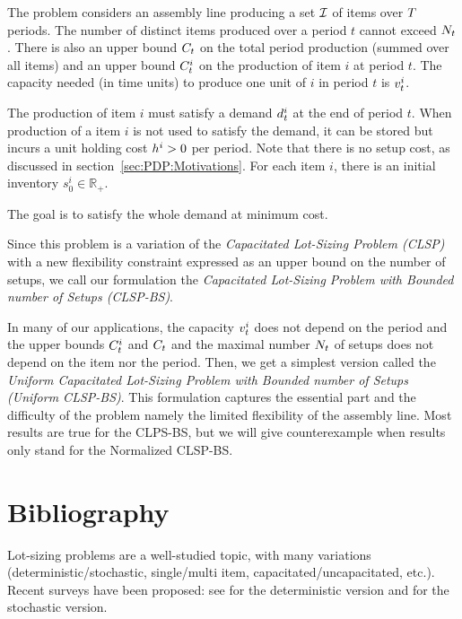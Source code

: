 The problem considers an assembly line producing a set $\mathcal{I}$ of items over $T$ periods. The number of distinct items produced over a period $t$ cannot exceed $N_t$. There is also an upper bound $C_t$ on the total period production (summed over all items) and an upper bound $C_t^i$ on the production of item $i$ at period $t$. The capacity needed (in time units) to produce one unit of $i$ in period $t$ is $v_t^i$.

The production of item $i$ must satisfy a demand $d_t^i$ at the end of period $t$. When production of a item $i$ is not used to satisfy the demand, it can be stored but incurs a unit holding cost $h^i>0$ per period. Note that there is no setup cost, as discussed in section~\ref{sec:PDP:Motivations}. For each item $i$, there is an initial inventory $s_0^i\in\mathbb{R}_+$.

The goal is to satisfy the whole demand at minimum cost.

Since this problem is a variation of the \emph{Capacitated Lot-Sizing Problem (CLSP)} with a new flexibility constraint expressed as an upper bound on the number of setups, we call our formulation the \emph{Capacitated Lot-Sizing Problem with Bounded number of Setups (CLSP-BS)}.

In many of our applications, the capacity $v_t^i$ does not depend on the period and the upper bounds $C_t^i$ and $C_t$ and the maximal number $N_t$ of setups does not depend on the item nor the period. Then, we get a simplest version called the \emph{Uniform Capacitated Lot-Sizing Problem with Bounded number of Setups (Uniform CLSP-BS)}. This formulation captures the essential part and the difficulty of the problem namely the limited flexibility of the assembly line. Most results are true for the CLPS-BS, but we will give counterexample when results only stand for the Normalized CLSP-BS.


\section{Bibliography}


Lot-sizing problems are a well-studied topic, with many variations (deterministic/stochastic, single/multi item, capacitated/uncapacitated, etc.). Recent surveys have been proposed: see \cite{Gicquel2008,quadt2008capacitated} for the deterministic version and \cite{Mula2006,Aloulou2014,Diaz-Madronero2014} for the stochastic version.

